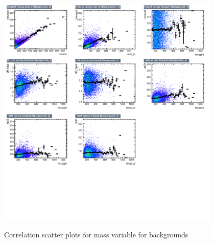 \begin{figure}[!htb]%
\centering
\includegraphics[width=0.95\textwidth]{figures/CRTT/dataset/plots/correlationscatter_hmass0__Id_c3.pdf}
\includegraphics[width=0.95\textwidth]{figures/CRTT/dataset/plots/correlationscatter_hmass0__Id_c4.pdf}
\caption{ Correlation scatter plots for \HZZ mass variable for backgrounds}%
\label{fig:correlations_CRTT_hmass0_BG}                                                       
\end{figure}





